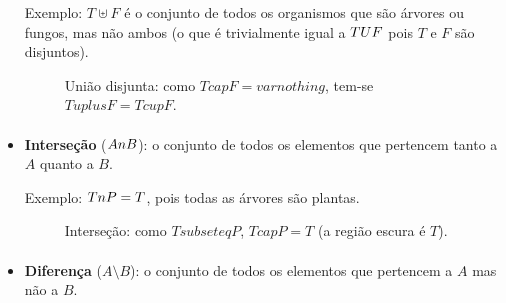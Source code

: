 \documentclass[12pt,a4paper]{article}
\def\\{}%
\def\cup{\string U}%
\def\cap{\string n}%
\begin{document}
\begin{itemize}
    Exemplo: \(T \uplus F\) é o conjunto de todos os organismos que são árvores ou fungos, mas não ambos (o que é trivialmente igual a \(T \cup F\) pois \(T\) e \(F\) são disjuntos).
    \begin{figure}[H]
    \centering
    \caption{União disjunta: como $T\\cap F=\\varnothing$, tem-se $T\\uplus F = T\\cup F$.}
    \label{fig:op-uniao-disjunta}
    \end{figure}

    \paragraph{}
    \item \textbf{Interseção} (\(A \cap B\)): o conjunto de todos os elementos que pertencem tanto a \(A\) quanto a \(B\).
    
    Exemplo: \(T \cap P = T\), pois todas as árvores são plantas.
    \begin{figure}[H]
    \centering
    \caption{Interseção: como $T\\subseteq P$, $T\\cap P = T$ (a região escura é $T$).}
    \label{fig:op-intersecao}
    \end{figure}

    \paragraph{}    
    \item \textbf{Diferença} (\(A \setminus B\)): o conjunto de todos os elementos que pertencem a \(A\) mas não a \(B\).
    

\end{itemize}
\end{document}
